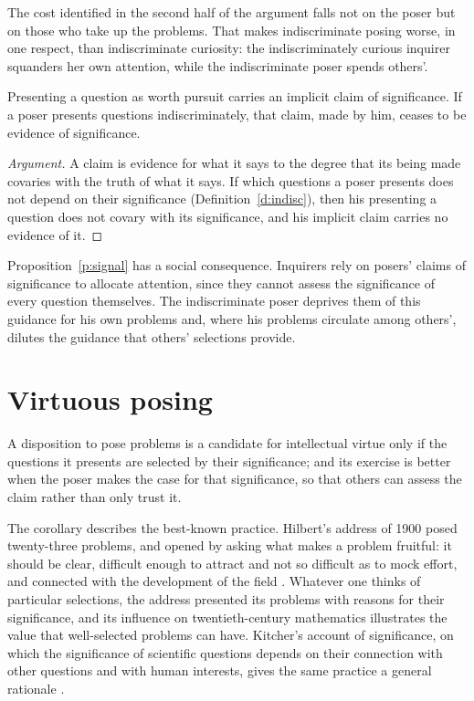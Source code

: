 \documentclass{situationist-preprint}
\begin{document}
The cost identified in the second half of the argument falls not on the poser but on those who take up the problems. That makes indiscriminate posing worse, in one respect, than indiscriminate curiosity: the indiscriminately curious inquirer squanders her own attention, while the indiscriminate poser spends others'.

\begin{proposition}\label{p:signal}
Presenting a question as worth pursuit carries an implicit claim of significance. If a poser presents questions indiscriminately, that claim, made by him, ceases to be evidence of significance.
\end{proposition}

\begin{proof}[Argument]
A claim is evidence for what it says to the degree that its being made covaries with the truth of what it says. If which questions a poser presents does not depend on their significance (Definition~\ref{d:indisc}), then his presenting a question does not covary with its significance, and his implicit claim carries no evidence of it.
\end{proof}

Proposition~\ref{p:signal} has a social consequence. Inquirers rely on posers' claims of significance to allocate attention, since they cannot assess the significance of every question themselves. The indiscriminate poser deprives them of this guidance for his own problems and, where his problems circulate among others', dilutes the guidance that others' selections provide.

\section{Virtuous posing}

\begin{corollary}\label{c:virtuous}
A disposition to pose problems is a candidate for intellectual virtue only if the questions it presents are selected by their significance; and its exercise is better when the poser makes the case for that significance, so that others can assess the claim rather than only trust it.
\end{corollary}

The corollary describes the best-known practice. Hilbert's address of 1900 posed twenty-three problems, and opened by asking what makes a problem fruitful: it should be clear, difficult enough to attract and not so difficult as to mock effort, and connected with the development of the field \citep{Hilbert1902}. Whatever one thinks of particular selections, the address presented its problems with reasons for their significance, and its influence on twentieth-century mathematics illustrates the value that well-selected problems can have. Kitcher's account of significance, on which the significance of scientific questions depends on their connection with other questions and with human interests, gives the same practice a general rationale \citep{Kitcher2001}.
\end{document}
